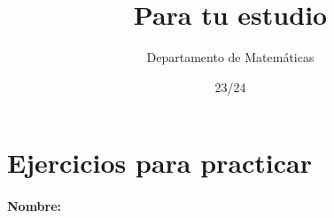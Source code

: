 \documentclass[palatino,nochap]{Docencia}
\title{Para tu estudio}
\author{Departamento de Matemáticas}
\date{23/24}
\begin{document}
\pagestyle{plain}

\section{Ejercicios para practicar}

\paragraph{Nombre: }


\end{document}

